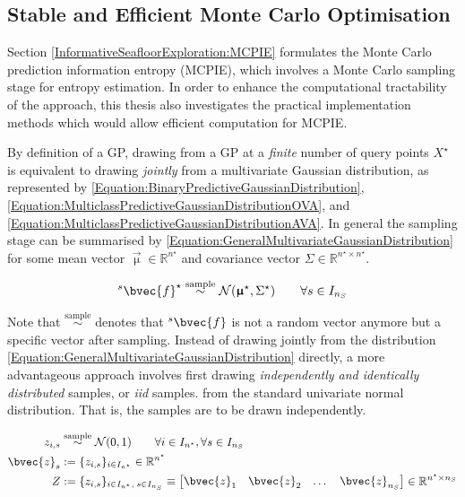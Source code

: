 		\subsection{Stable and Efficient Monte Carlo Optimisation}
		\label{Appendix:ComputationalAspects:NumericalStability:MonteCarlo}
		
			Section \ref{InformativeSeafloorExploration:MCPIE} formulates the Monte Carlo prediction information entropy (MCPIE), which involves a Monte Carlo sampling stage for entropy estimation. In order to enhance the computational tractability of the approach, this thesis also investigates the practical implementation methods which would allow efficient computation for MCPIE.
			
			By definition of a GP, drawing from a GP at a \textit{finite} number of query points $X^{\star}$ is equivalent to drawing \textit{jointly} from a multivariate Gaussian distribution, as represented by \eqref{Equation:BinaryPredictiveGaussianDistribution}, \eqref{Equation:MulticlassPredictiveGaussianDistributionOVA}, and \eqref{Equation:MulticlassPredictiveGaussianDistributionAVA}. In general the sampling stage can be summarised by \eqref{Equation:GeneralMultivariateGaussianDistribution} for some mean vector $\vec{\upmu} \in \mathbb{R}^{n^{\star}}$ and covariance vector $\Sigma \in \mathbb{R}^{n^{\star} \times n^{\star}}$. 
			
			\begin{equation}
				{^{s}}\bvec{f}^{\star} \stackrel{\text{sample}}{\sim} \mathcal{N}(\vec{\upmu}^{\star}, \Sigma^{\star}) \qquad \forall s \in I_{n_{S}}
			\label{Equation:GeneralMultivariateGaussianDistribution}
			\end{equation}
			
			Note that $\stackrel{\text{sample}}{\sim}$ denotes that ${^{s}}\bvec{f}$ is not a random vector anymore but a specific vector after sampling. Instead of drawing jointly from the distribution \eqref{Equation:GeneralMultivariateGaussianDistribution} directly, a more advantageous approach involves first drawing \textit{independently and identically distributed} samples, or \textit{iid} samples. from the standard univariate normal distribution. That is, the samples are to be drawn independently.
			
			\begin{equation}
				\begin{aligned}
					z_{i, s} &\stackrel{\text{sample}}{\sim} \mathcal{N}(0, 1) \qquad \forall i \in I_{n^{\star}}, \forall s \in I_{n_{S}} \\
					\bvec{z}_{s} &:= \{z_{i, s}\}_{i \in I_{n^{\star}}} \in \mathbb{R}^{n^{\star}} \\
					Z &:= \{z_{i, s}\}_{i \in I_{n^{\star}}, \; s \in I_{n_{S}}} \equiv \begin{bmatrix} \bvec{z}_{1} & \bvec{z}_{2} & \dots & \bvec{z}_{n_{S}} \end{bmatrix} \in \mathbb{R}^{n^{\star} \times n_{S}}
				\end{aligned}
			\label{Equation:iidGaussianSampling}
			\end{equation}			
			
